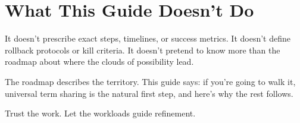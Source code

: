 \documentclass[11pt]{article}
\begin{document}
\section{What This Guide Doesn't Do}

It doesn't prescribe exact steps, timelines, or success metrics.
It doesn't define rollback protocols or kill criteria.  It doesn't
pretend to know more than the roadmap about where the clouds of
possibility lead.

The roadmap describes the territory.  This guide says: if you're
going to walk it, universal term sharing is the natural first step,
and here's why the rest follows.

Trust the work.  Let the workloads guide refinement.
\end{document}
